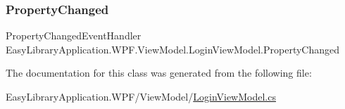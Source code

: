 \subsubsection{\texorpdfstring{Property\+Changed}{PropertyChanged}}
{\footnotesize\ttfamily Property\+Changed\+Event\+Handler Easy\+Library\+Application.\+W\+P\+F.\+View\+Model.\+Login\+View\+Model.\+Property\+Changed}



The documentation for this class was generated from the following file\+:\begin{DoxyCompactItemize}
\item 
Easy\+Library\+Application.\+W\+P\+F/\+View\+Model/\mbox{\hyperlink{_login_view_model_8cs}{Login\+View\+Model.\+cs}}\end{DoxyCompactItemize}
